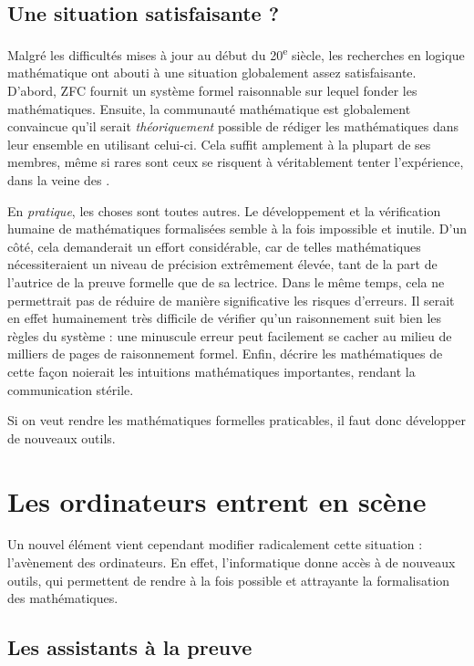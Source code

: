 \subsection{Une situation satisfaisante ?}

Malgré les difficultés mises à jour au début du 20\textsuperscript{e}
siècle, les recherches en logique mathématique ont abouti à une situation
globalement assez satisfaisante. D’abord, ZFC fournit un système formel raisonnable sur
lequel fonder les mathématiques. Ensuite,
la communauté mathématique est globalement convaincue qu’il serait
\emph{théoriquement} possible de rédiger les mathématiques dans leur ensemble
en utilisant celui-ci. Cela suffit amplement à la plupart de ses membres,
même si rares sont ceux se risquent à véritablement tenter l’expérience, dans la veine
des .

En \emph{pratique}, les choses sont toutes autres.
Le développement et la vérification humaine de mathématiques
formalisées%
semble à la fois impossible et inutile.
D’un côté, cela demanderait un effort considérable, car de telles mathématiques
nécessiteraient un niveau de précision extrêmement élevée, tant de la part de l’autrice
de la preuve formelle que de sa lectrice.
Dans le même temps, cela ne permettrait pas de réduire de manière significative
les risques d’erreurs. Il serait en effet
humainement très difficile de vérifier qu’un raisonnement suit bien les règles du
système : une minuscule erreur peut facilement se cacher au milieu de
milliers de pages de raisonnement formel.
Enfin, décrire les mathématiques de cette façon noierait
les intuitions mathématiques importantes, rendant la communication stérile.

Si on veut rendre les mathématiques formelles praticables, il faut donc développer
de nouveaux outils.

\section{Les ordinateurs entrent en scène}
\label{sec:assistants-preuve}

Un nouvel élément vient cependant modifier radicalement cette situation :
l’avènement des ordinateurs. En effet, l’informatique donne accès à de nouveaux outils,
qui permettent de rendre à la fois possible et attrayante la formalisation
des mathématiques.

\subsection{Les assistants à la preuve}


